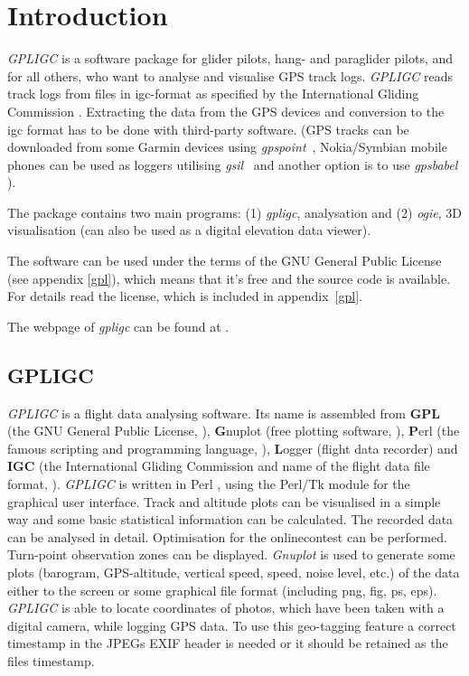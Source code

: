\section{Introduction}
\emph{GPLIGC} is a software package for glider pilots, hang- and paraglider pilots, and for all others,
who want to analyse and visualise GPS track logs.
\emph{GPLIGC} reads track logs from files in igc-format as specified by the International Gliding Commission \cite{igc}.
Extracting the data from the GPS devices and conversion to the igc format has to be done with third-party software.
(GPS tracks can be downloaded from some Garmin devices using \emph{gpspoint}~\cite{gpspoint},
Nokia/Symbian mobile phones can be used as loggers utilising \emph{gsil}~\cite{gsil}
and another option is to use \emph{gpsbabel} \cite{gpsbabel}).

The package contains two main programs: (1) \emph{gpligc}, analysation and (2) \emph{ogie},
3D visualisation (can also be used as a digital elevation data viewer).

The software can be used under the terms of the GNU General Public License (see appendix \ref{gpl}),
which means that it's free and the source code is available.
For details read the license, which is included in appendix~\ref{gpl}.

The webpage of \emph{gpligc} can be found at \cite{gpligc}.

\subsection{GPLIGC}
\emph{GPLIGC} is a flight data analysing software. Its name is assembled from \textbf{GPL} (the GNU General Public License, \cite{fsf}), \textbf{G}nuplot (free plotting software, \cite{gnuplot}), \textbf{P}erl (the famous scripting and programming language, \cite{perl}), \textbf{L}ogger (flight data recorder) and \textbf{IGC} (the International Gliding Commission and name of the flight data file format, \cite{igc}).
\emph{GPLIGC} is written in Perl \cite{perl}, using the Perl/Tk module \cite{perltk} for the graphical user interface.
Track and altitude plots can be visualised in a simple way and some basic statistical information can be calculated.
The recorded data can be analysed in detail.
Optimisation for the onlinecontest can be performed. Turn-point observation zones can be displayed.
\emph{Gnuplot} \cite{gnuplot} is used to generate some plots (barogram, GPS-altitude, vertical speed, speed, noise level, etc.) of the data either to the screen or some graphical file format (including png, fig, ps, eps).
\emph{GPLIGC} is able to locate coordinates of photos, which have been taken with a digital camera, while logging GPS data.
To use this geo-tagging feature a correct timestamp in the JPEGs EXIF header is needed or it should be retained as the files timestamp.

